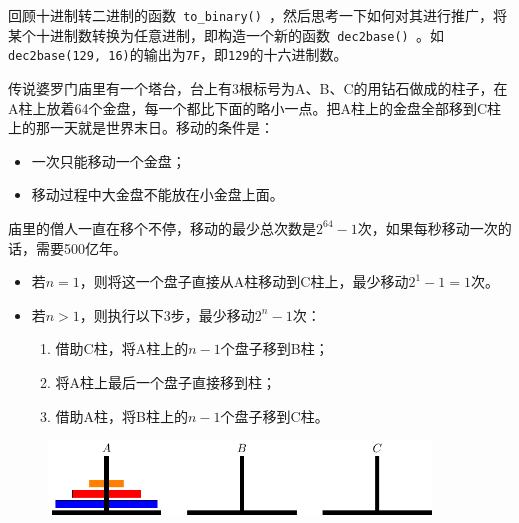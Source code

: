 \begin{frame}
  \begin{biancheng}
    回顾十进制转二进制的函数\lstinline| to_binary() |，然后思考一下如何对其进行推广，将某个十进制数转换为任意进制，即构造一个新的函数\lstinline| dec2base() |。如\lstinline|dec2base(129, 16)|的输出为\lstinline|7F|，即\lstinline|129|的十六进制数。
  \end{biancheng}
\end{frame}

\begin{frame}
  \begin{biancheng}
    传说婆罗门庙里有一个塔台，台上有3根标号为A、B、C的用钻石做成的柱子，在A柱上放着64个金盘，每一个都比下面的略小一点。把A柱上的金盘全部移到C柱上的那一天就是世界末日。移动的条件是：
    \begin{itemize}
    \item 一次只能移动一个金盘；
    \item 移动过程中大金盘不能放在小金盘上面。
    \end{itemize}
    庙里的僧人一直在移个不停，移动的最少总次数是$2^{64}-1$次，如果每秒移动一次的话，需要500亿年。
  \end{biancheng}
\end{frame}

\begin{frame}
  \begin{itemize}
  \item 若$n=1$，则将这一个盘子直接从A柱移动到C柱上，最少移动$2^1-1=1$次。
  \item 若$n>1$，则执行以下3步，最少移动$2^n-1$次：
    \begin{enumerate}
    \item 借助C柱，将A柱上的$n-1$个盘子移到B柱；\\[.1in]
    \item 将A柱上最后一个盘子直接移到柱；\\[.1in]
    \item 借助A柱，将B柱上的$n-1$个盘子移到C柱。
    \end{enumerate}
  \end{itemize}
\end{frame}

\begin{frame}
  \begin{figure}[htbp]
    \centering
    \includegraphics[width=4in]{ch09/images/ht0.pdf}
  \end{figure}
\end{frame}

